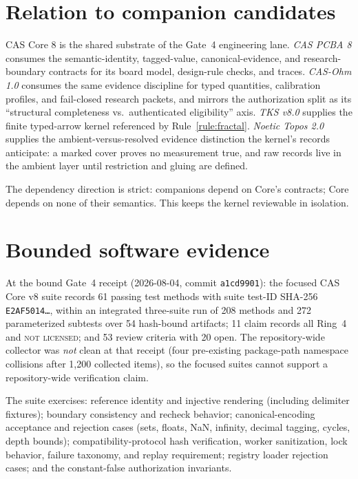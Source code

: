 \documentclass[11pt]{amsart}
\theoremstyle{definition}
\theoremstyle{remark}
\begin{document}
\section{Relation to companion candidates}\label{sec:companions}

CAS Core 8 is the shared substrate of the Gate~4 engineering lane. \emph{CAS PCBA 8} consumes the semantic-identity, tagged-value, canonical-evidence, and research-boundary contracts for its board model, design-rule checks, and traces. \emph{CAS-Ohm 1.0} consumes the same evidence discipline for typed quantities, calibration profiles, and fail-closed research packets, and mirrors the authorization split as its ``structural completeness vs.\ authenticated eligibility'' axis. \emph{TKS v8.0} supplies the finite typed-arrow kernel referenced by Rule~\ref{rule:fractal}. \emph{Noetic Topos 2.0} supplies the ambient-versus-resolved evidence distinction the kernel's records anticipate: a marked cover proves no measurement true, and raw records live in the ambient layer until restriction and gluing are defined.

The dependency direction is strict: companions depend on Core's contracts; Core depends on none of their semantics. This keeps the kernel reviewable in isolation.

\section{Bounded software evidence}\label{sec:evidence}

At the bound Gate~4 receipt (2026-08-04, commit \texttt{a1cd9901}): the focused CAS Core v8 suite records 61 passing test methods with suite test-ID SHA-256 \texttt{E2AF5014\ldots}, within an integrated three-suite run of 208 methods and 272 parameterized subtests over 54 hash-bound artifacts; 11 claim records all Ring~4 and \textsc{not licensed}; and 53 review criteria with 20 open. The repository-wide collector was \emph{not} clean at that receipt (four pre-existing package-path namespace collisions after 1{,}200 collected items), so the focused suites cannot support a repository-wide verification claim.

The suite exercises: reference identity and injective rendering (including delimiter fixtures); boundary consistency and recheck behavior; canonical-encoding acceptance and rejection cases (sets, floats, NaN, infinity, decimal tagging, cycles, depth bounds); compatibility-protocol hash verification, worker sanitization, lock behavior, failure taxonomy, and replay requirement; registry loader rejection cases; and the constant-false authorization invariants.
\end{document}
